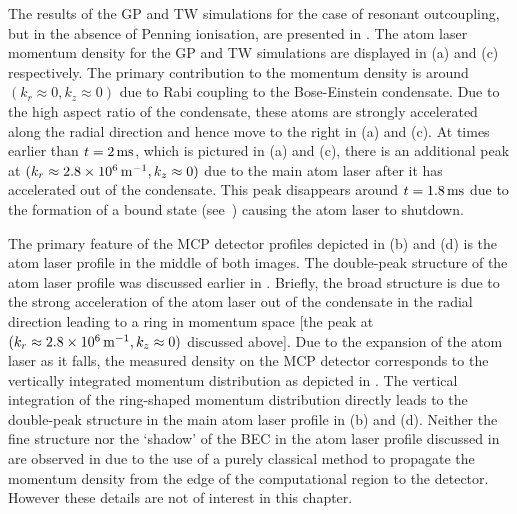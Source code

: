 The results of the GP and TW simulations for the case of resonant outcoupling, but in the absence of Penning ionisation, are presented in . The atom laser momentum density for the GP and TW simulations are displayed in (a) and (c) respectively. The primary contribution to the momentum density is around $(k_r \approx 0, k_z \approx 0)$ due to Rabi coupling to the Bose-Einstein condensate. Due to the high aspect ratio of the condensate, these atoms are strongly accelerated along the radial direction and hence move to the right in (a) and (c). At times earlier than $t=\unit[2]{ms}$, which is pictured in (a) and (c), there is an additional peak at $(k_r \approx \unit[2.8 \times 10^6]{m}^{-1}, k_z \approx 0)$ due to the main atom laser after it has accelerated out of the condensate. This peak disappears around $t=\unit[1.8]{ms}$ due to the formation of a bound state (see~\citep{Robins:2005uq}) causing the atom laser to shutdown.

The primary feature of the MCP detector profiles depicted in (b) and (d) is the atom laser profile in the middle of both images. The double-peak structure of the atom laser profile was discussed earlier in . Briefly, the broad structure is due to the strong acceleration of the atom laser out of the condensate in the radial direction leading to a ring in momentum space [the peak at $(k_r \approx \unit[2.8 \times10^6]{m}^{-1}, k_z \approx 0)$ discussed above]. Due to the expansion of the atom laser as it falls, the measured density on the MCP detector corresponds to the vertically integrated momentum distribution as depicted in . The vertical integration of the ring-shaped momentum distribution directly leads to the double-peak structure in the main atom laser profile in (b) and (d). Neither the fine structure nor the `shadow' of the BEC in the atom laser profile discussed in  are observed in  due to the use of a purely classical method to propagate the momentum density from the edge of the computational region to the detector. However these details are not of interest in this chapter.

